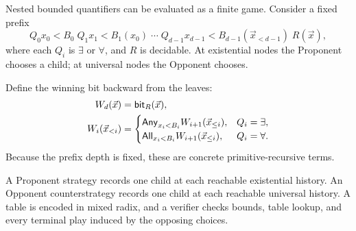 Nested bounded quantifiers can be evaluated as a finite game.  Consider a fixed prefix
\[
  Q_0x_0<B_0\;Q_1x_1<B_1(x_0)\;\cdots\;
  Q_{d-1}x_{d-1}<B_{d-1}(\vec x_{<d-1})\;R(\vec x),
\]
where each \(Q_i\) is \(\exists\) or \(\forall\), and \(R\) is decidable.  At existential nodes the Proponent chooses a child; at universal nodes the Opponent chooses.

Define the winning bit backward from the leaves:
\[
\begin{aligned}
W_d(\vec x)&=\mathsf{bit}_R(\vec x),\\
W_i(\vec x_{<i})&=
\begin{cases}
\mathsf{Any}_{x_i<B_i} W_{i+1}(\vec x_{\le i}),&Q_i=\exists,\\
\mathsf{All}_{x_i<B_i} W_{i+1}(\vec x_{\le i}),&Q_i=\forall.
\end{cases}
\end{aligned}
\]
Because the prefix depth is fixed, these are concrete primitive-recursive terms.

\begin{definition}
A Proponent strategy records one child at each reachable existential history.  An Opponent counterstrategy records one child at each reachable universal history.  A table is encoded in mixed radix, and a verifier checks bounds, table lookup, and every terminal play induced by the opposing choices.
\end{definition}

